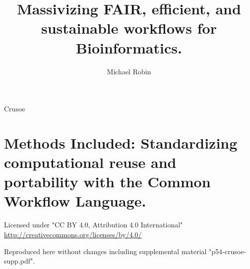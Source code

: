 \documentclass{dissertation}
\begin{document}
\title{Massivizing {FAIR,} {efficient,} and sustainable workflows for Bioinformatics.}
\author{Michael Robin}{Crusoe}

\frontmatter




\tableofcontents




\mainmatter

\thumbtrue

\nobibliography*



\chapter{Methods Included: Standardizing computational reuse and portability with the Common Workflow Language.}
\label{methods-included}


Licensed under "CC BY 4.0, Attribution 4.0 International" \url{http://creativecommons.org/licenses/by/4.0/}

Reproduced here without changes including supplemental material "p54-crusoe-supp.pdf".


\end{document}
